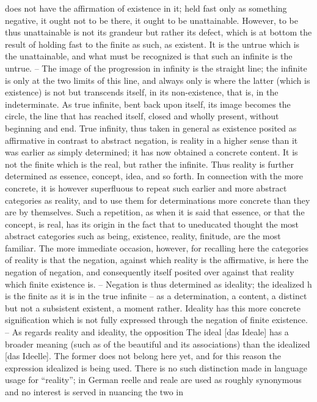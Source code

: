 does not have the affirmation of existence in it; held fast only as something
negative, it ought not to be there, it ought to be unattainable. However, to
be thus unattainable is not its grandeur but rather its defect, which is at
bottom the result of holding fast to the finite as such, as existent. It is the
untrue which is the unattainable, and what must be recognized is that such
an infinite is the untrue. – The image of the progression in infinity is the
straight line; the infinite is only at the two limits of this line, and always
only is where the latter (which is existence) is not but transcends itself, in
its non-existence, that is, in the indeterminate. As true infinite, bent back
upon itself, its image becomes the circle, the line that has reached itself,
closed and wholly present, without beginning and end.
True infinity, thus taken in general as existence posited as affirmative in
contrast to abstract negation, is reality in a higher sense than it was earlier
as simply determined; it has now obtained a concrete content. It is not
the finite which is the real, but rather the infinite. Thus reality is further
determined as essence, concept, idea, and so forth. In connection with the
more concrete, it is however superfluous to repeat such earlier and more
abstract categories as reality, and to use them for determinations more
concrete than they are by themselves. Such a repetition, as when it is said
that essence, or that the concept, is real, has its origin in the fact that to
uneducated thought the most abstract categories such as being, existence,
reality, finitude, are the most familiar.
The more immediate occasion, however, for recalling here the categories
of reality is that the negation, against which reality is the affirmative, is here
the negation of negation, and consequently itself posited over against that
reality which finite existence is. – Negation is thus determined as ideality;
the idealized h is the finite as it is in the true infinite – as a determination, a
content, a distinct but not a subsistent existent, a moment rather. Ideality has
this more concrete signification which is not fully expressed through the
negation of finite existence. – As regards reality and ideality, the opposition
The ideal [das Ideale] has a broader meaning (such as of the beautiful and its associations) than
the idealized [das Ideelle]. The former does not belong here yet, and for this reason the expression
idealized is being used. There is no such distinction made in language usage for “reality”; in German
reelle and reale are used as roughly synonymous and no interest is served in nuancing the two in
